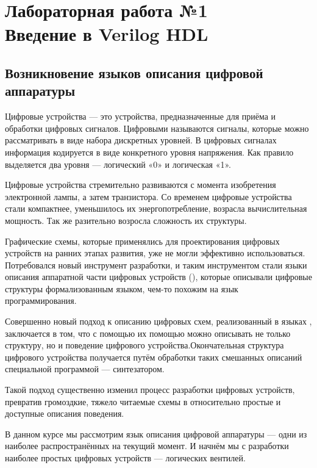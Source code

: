 \chapter{Лабораторная работа №1\\Введение в Verilog HDL} 
\section{Возникновение языков описания цифровой аппаратуры}

\par{Цифровые устройства — это устройства, предназначенные для приёма и обработки цифровых сигналов. Цифровыми называются сигналы, которые можно рассматривать в виде набора дискретных уровней. В цифровых сигналах информация кодируется в виде конкретного уровня напряжения. Как правило выделяется два уровня — логический «0» и логическая «1».}

\par{Цифровые устройства стремительно развиваются с момента изобретения электронной лампы, а затем транзистора. Со временем цифровые устройства стали компактнее, уменьшилось их энергопотребление, возрасла вычислительная мощность. Так же разительно возросла сложность их структуры.}

\par{Графические схемы, которые применялись для проектирования цифровых устройств на ранних этапах развития, уже не могли эффективно использоваться. Потребовался новый инструмент разработки, и таким инструментом стали языки описания аппаратной части цифровых устройств (), которые описывали цифровые структуры формализованным языком, чем-то похожим на язык программирования.}

\par{Совершенно новый подход к описанию цифровых схем, реализованный в языках , заключается в том, что с помощью их помощью можно описывать не только структуру, но и поведение цифрового устройства.Окончательная структура цифрового устройства получается путём обработки таких смешанных описаний специальной программой — синтезатором.}

\par{Такой подход существенно изменил процесс разработки цифровых устройств, превратив громоздкие, тяжело читаемые схемы в относительно простые и доступные описания поведения.}

\par{В данном курсе мы рассмотрим язык описания цифровой аппаратуры  — одни из наиболее распространённых на текущий момент. И начнём мы с разработки наиболее простых цифровых устройств — логических вентилей.}

